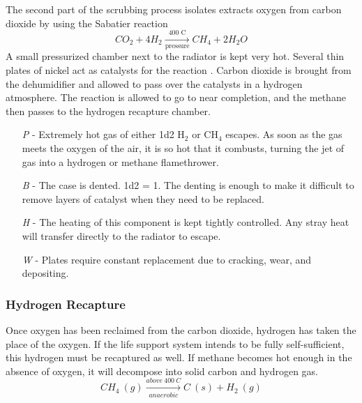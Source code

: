 \documentclass[a4paper]{article}
\begin{document}
The second part of the scrubbing process isolates extracts oxygen from carbon dioxide by using the Sabatier reaction 
\begin{equation} \label{sabatier_reaction}
CO_2 + 4 H_2 \xrightarrow[\text{pressure}]{\text{400 C}} CH_4 + 2 H_2O
\end{equation}
A small pressurized chamber next to the radiator is kept very hot. Several thin plates of nickel act as catalysts for the reaction \cite{recycling_water_and_air}. Carbon dioxide is brought from the dehumidifier and allowed to pass over the catalysts in a hydrogen atmosphere. The reaction is allowed to go to near completion, and the methane then passes to the hydrogen recapture chamber.   
\begin{enumerate}
\item [\textit{P}] - Extremely hot gas of either 1d2 H$_2$ or CH$_4$ escapes. As soon as the gas meets the oxygen of the air, it is so hot that it combusts, turning the jet of gas into a hydrogen or methane flamethrower.
\item [\textit{B}] - The case is dented. \newline \hspace{3pt} 1d2 = 1. The denting is enough to make it difficult to remove layers of catalyst when they need to be replaced.
\item [\textit{H}] - The heating of this component is kept tightly controlled. Any stray heat will transfer directly to the radiator to escape. 
\item [\textit{W}] - Plates require constant replacement due to cracking, wear, and depositing. 
\end{enumerate}

\vspace{-0.5cm} \hspace{-18pt} \subsubsection{Hydrogen Recapture} \label{life_h2_recapture} \vspace{-0.2cm}
Once oxygen has been reclaimed from the carbon dioxide, hydrogen has taken the place of the oxygen. If the life support system intends to be fully self-sufficient, this hydrogen must be recaptured as well. If methane becomes hot enough in the absence of oxygen, it will decompose into solid carbon and hydrogen gas. 
\begin{equation} \label{anaerobic_decomposition_of_methane}
CH_4\ (g) \xrightarrow[anaerobic]{above\ 400\ C} C\ (s) + H_2\ (g)
\end{equation}
\end{document}
